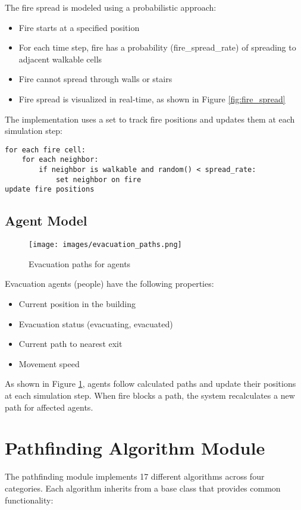 \documentclass[11pt,a4paper]{report}
\begin{document}
The fire spread is modeled using a probabilistic approach:
\begin{itemize}
    \item Fire starts at a specified position
    \item For each time step, fire has a probability (fire\_spread\_rate) of spreading to adjacent walkable cells
    \item Fire cannot spread through walls or stairs
    \item Fire spread is visualized in real-time, as shown in Figure \ref{fig:fire_spread}
\end{itemize}

The implementation uses a set to track fire positions and updates them at each simulation step:

\begin{verbatim}
for each fire cell:
    for each neighbor:
        if neighbor is walkable and random() < spread_rate:
            set neighbor on fire
update fire positions
\end{verbatim}

\subsection{Agent Model}
\begin{figure}[H]
    \centering
    \texttt{[image: images/evacuation\_paths.png]}
    \caption{Evacuation paths for agents}
    \label{fig:evacuation_paths}
\end{figure}

Evacuation agents (people) have the following properties:
\begin{itemize}
    \item Current position in the building
    \item Evacuation status (evacuating, evacuated)
    \item Current path to nearest exit
    \item Movement speed
\end{itemize}

As shown in Figure \ref{fig:evacuation_paths}, agents follow calculated paths and update their positions at each simulation step. When fire blocks a path, the system recalculates a new path for affected agents.

\section{Pathfinding Algorithm Module}
The pathfinding module implements 17 different algorithms across four categories. Each algorithm inherits from a base class that provides common functionality:
\end{document}
